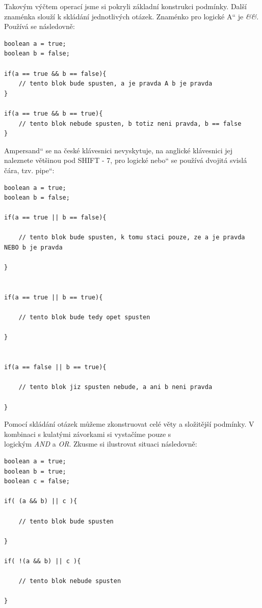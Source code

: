 \documentclass[10pt,twoside=true,open=right,cleardoublepage=empty,chapterprefix=true]{scrbook}
\renewcommand\uv[1]{\quotedblbase #1\textquotedblleft}%
\newcommand{\klavesy}[1]{\textsc{#1}}
\begin{document}
Takovým výčtem operací jsme si pokryli základní konstrukci podmínky. Další znaménka slouží k skládání jednotlivých otázek. Znaménko pro logické \uv{A} je {\em \&\&}. Používá se následovně:

\begin{lstlisting}
boolean a = true;
boolean b = false;

if(a == true && b == false){
	// tento blok bude spusten, a je pravda A b je pravda
}

if(a == true && b == true){
	// tento blok nebude spusten, b totiz neni pravda, b == false
}

\end{lstlisting}


\uv{Ampersand} se na české klávesnici nevyskytuje, na anglické klávesnici jej naleznete většinou pod \klavesy {SHIFT - 7}, pro logické \uv{nebo} se používá dvojitá svislá čára, tzv. \uv{pipe}:

\begin{lstlisting}
boolean a = true;
boolean b = false;

if(a == true || b == false){

	// tento blok bude spusten, k tomu staci pouze, ze a je pravda NEBO b je pravda

}


if(a == true || b == true){

	// tento blok bude tedy opet spusten

}


if(a == false || b == true){

	// tento blok jiz spusten nebude, a ani b neni pravda 

}

\end{lstlisting}

Pomocí skládání otázek můžeme zkonstruovat celé věty a složitější podmínky. V kombinaci s kulatými závorkami si vystačíme pouze s \\logickým {\em AND} a {\em OR}. Zkusme si ilustrovat situaci následovně:


\begin{lstlisting}
boolean a = true;
boolean b = true;
boolean c = false;

if( (a && b) || c ){

	// tento blok bude spusten
	
}

if( !(a && b) || c ){

	// tento blok nebude spusten
	
}

\end{lstlisting}
\end{document}
